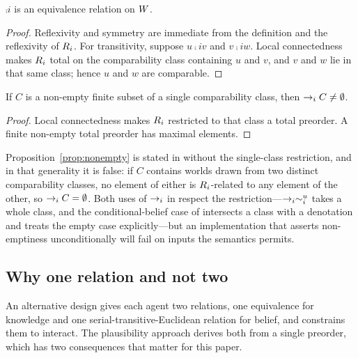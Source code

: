 \documentclass[11pt,a4paper]{article}
\begin{document}
\begin{proposition}
$\comp{i}$ is an equivalence relation on $W$.
\end{proposition}

\begin{proof}
Reflexivity and symmetry are immediate from the definition and the reflexivity of
$R_{i}$. For transitivity, suppose $u \comp{i} v$ and $v \comp{i} w$. Local connectedness
makes $R_{i}$ total on the comparability class containing $u$ and $v$, and $v$ and $w$
lie in that same class; hence $u$ and $w$ are comparable.
\end{proof}

\begin{proposition}
\label{prop:nonempty}
If $C$ is a non-empty finite subset of a single comparability class, then $\rightarrow_{i} C \neq
\emptyset$.
\end{proposition}

\begin{proof}
Local connectedness makes $R_{i}$ restricted to that class a total preorder. A finite
non-empty total preorder has maximal elements.
\end{proof}

\begin{remark}
\label{rem:nonempty}
Proposition~\ref{prop:nonempty} is stated in \citet{buckingham2021thesis} without the single-class
restriction, and in that generality it is false: if $C$ contains worlds drawn from two
distinct comparability classes, no element of either is $R_{i}$-related to any element of
the other, so $\rightarrow_{i} C = \emptyset$. Both uses of $\rightarrow_{i}$ in \mBplus{} respect the
restriction---$\rightarrow_{i}\sim_{i}^{u}$ takes a whole class, and the conditional-belief case of
 intersects a class with a denotation and treats the empty case
explicitly---but an implementation that asserts non-emptiness unconditionally will fail on
inputs the semantics permits.
\end{remark}

\subsection{Why one relation and not two}

An alternative design gives each agent two relations, one equivalence for knowledge and one
serial-transitive-Euclidean relation for belief, and constrains them to interact. The
plausibility approach derives both from a single preorder, which has two consequences that
matter for this paper.
\end{document}
